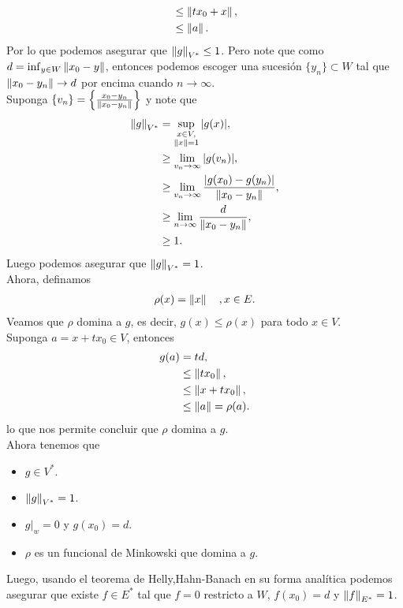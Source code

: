 \begin{homeworkProblem}
\begin{solution}
\begin{enumerate}
\begin{align*}
          &\leq \left\|tx_0+x\right\|,\\
          &\leq \left\|a\right\|.
        \end{align*}
        Por lo que podemos asegurar que $\left\|g\right\|_{V^{*}}\leq 1$. Pero note que como $d=\inf_{y\in W}\left\|x_0-y\right\|$, entonces podemos escoger una sucesión $\{y_n\}\subset W$ tal que $\left\|x_0-y_n\right\|\to d$ por encima cuando $n\to \infty$.\\
        Suponga $\{v_n\}=\left\{\frac{x_0-y_n}{\left\|x_0-y_n\right\|}\right\}$ y note que
        \begin{align*}
          \left\|g\right\|_{V^*}&=\sup_{\substack{x\in V,\\\left\|x\right\|=1}}|g(x)|,\\
          &\geq \lim_{v_n \to \infty}|g(v_n)|,\\
          &\geq \lim_{v_n \to \infty}\frac{\left| g(x_0)-g(y_n)\right|}{\left\|x_0-y_n\right\|},\\
          &\geq \lim_{n \to \infty}\frac{d}{\left\|x_0-y_n\right\|},\\
          &\geq 1.
        \end{align*}
        Luego podemos asegurar que $\left\|g\right\|_{V^*}=1$.\\
        Ahora, definamos
        \begin{align*}
          \rho(x)=\left\|x\right\|\quad,x\in E.
        \end{align*}
        Veamos que $\rho$ domina a $g$, es decir, $g(x)\leq \rho(x)$ para todo $x\in V$.\\
        Suponga $a=x+tx_0\in V$, entonces
        \begin{align*}
          g(a)&=td,\\
          &\leq \left\|tx_0\right\|,\\
          &\leq \left\|x+tx_0\right\|,\\
          &\leq \left\|a\right\|=\rho(a).
        \end{align*}
        lo que nos permite concluir que $\rho$  domina a $g$.\\
        Ahora tenemos que
        \begin{itemize}
          \item $g\in V^{*}$.\\
          \item $\left\|g\right\|_{V^*}=1$.\\
          \item $g|_{w}=0$ y $g(x_0)=d$.\\
          \item $\rho$ es un funcional de Minkowski que domina a $g$.
        \end{itemize}
        Luego, usando el teorema de Helly,Hahn-Banach en su forma analítica podemos asegurar que existe $f\in E^{*}$ tal que $f=0$ restricto a $W$, $f(x_0)=d$ y $\left\|f\right\|_{E^{*}}=1$.
    \end{enumerate}
  \end{solution}
\end{homeworkProblem}
